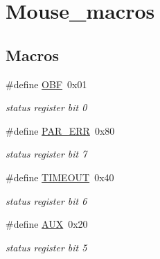 \hypertarget{group__mouse__macros}{}\section{Mouse\+\_\+macros}
\label{group__mouse__macros}
\subsection*{Macros}
\begin{DoxyCompactItemize}
\item 
\mbox{\label{group__mouse__macros_ga45967c9e25447ba853cf6fb4ac545fe6}} 
\#define \hyperlink{group__mouse__macros_ga45967c9e25447ba853cf6fb4ac545fe6}{O\+BF}~0x01
\begin{DoxyCompactList}\small\item\em status register bit 0 \end{DoxyCompactList}\item 
\mbox{\label{group__mouse__macros_ga307ab71673e26ec42b28a3bca05d4cb5}} 
\#define \hyperlink{group__mouse__macros_ga307ab71673e26ec42b28a3bca05d4cb5}{P\+A\+R\+\_\+\+E\+RR}~0x80
\begin{DoxyCompactList}\small\item\em status register bit 7 \end{DoxyCompactList}\item 
\mbox{\label{group__mouse__macros_ga45ba202b05caf39795aeca91b0ae547e}} 
\#define \hyperlink{group__mouse__macros_ga45ba202b05caf39795aeca91b0ae547e}{T\+I\+M\+E\+O\+UT}~0x40
\begin{DoxyCompactList}\small\item\em status register bit 6 \end{DoxyCompactList}\item 
\mbox{\label{group__mouse__macros_ga1b41fd2be63532d4ab910f8b256c3811}} 
\#define \hyperlink{group__mouse__macros_ga1b41fd2be63532d4ab910f8b256c3811}{A\+UX}~0x20
\begin{DoxyCompactList}\small\item\em status register bit 5 \end{DoxyCompactList}\item 
\mbox{\label{group__mouse__macros_ga03f542f1e0e2ba512c4ed189decfee3d}} 

\end{DoxyCompactItemize}
